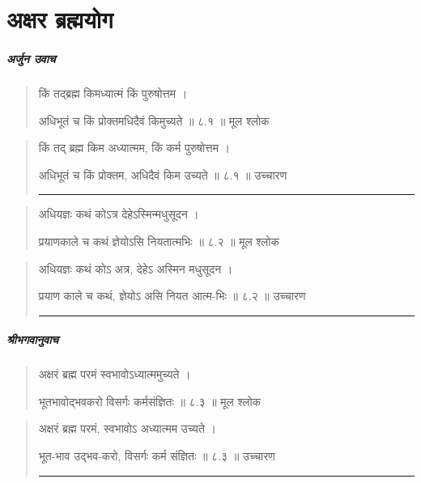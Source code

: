 \chapter{\sanskrit अक्षर ब्रह्मयोग} 
\paragraph{\sanskrit अर्जुन उवाच}
\begin{quotation} 
किं तद्ब्रह्म किमध्यात्मं किं पुरुषोत्तम  ।  

अधिभूतं च किं प्रोक्तमधिदैवं किमुच्यते  ॥ ८.१ ॥  मूल श्लोक
\end{quotation}

\begin{quotation}

किं तद् ब्रह्म किम अध्यात्मम, किं कर्म पुरुषोत्तम  ।  

अधिभूतं च किं प्रोक्तम, अधिदैवं किम उच्यते  ॥ ८.१ ॥  उच्चारण

\noindent\rule{16cm}{0.4pt} 
\end{quotation}


\begin{quotation} 

अधियज्ञः कथं कोऽत्र देहेऽस्मिन्मधुसूदन  ।  

प्रयाणकाले च कथं ज्ञेयोऽसि नियतात्मभिः  ॥ ८.२ ॥  मूल श्लोक
\end{quotation}

\begin{quotation}

अधियज्ञः कथं कोऽ अत्र, देहेऽ अस्मिन मधुसूदन  ।  

प्रयाण काले च कथं, ज्ञेयोऽ असि नियत आत्म-भिः  ॥ ८.२ ॥  उच्चारण

\noindent\rule{16cm}{0.4pt} 
\end{quotation}



\paragraph{\sanskrit श्रीभगवानुवाच}
\begin{quotation} 

अक्षरं ब्रह्म परमं स्वभावोऽध्यात्ममुच्यते  ।  

भूतभावोद्भवकरो विसर्गः कर्मसंज्ञितः  ॥ ८.३ ॥  मूल श्लोक
\end{quotation}

\begin{quotation}

अक्षरं ब्रह्म परमं, स्वभावोऽ अध्यात्मम उच्यते  ।  

भूत-भाव उद्भव-करो, विसर्गः कर्म संज्ञितः  ॥ ८.३ ॥  उच्चारण

\noindent\rule{16cm}{0.4pt} 
\end{quotation}


